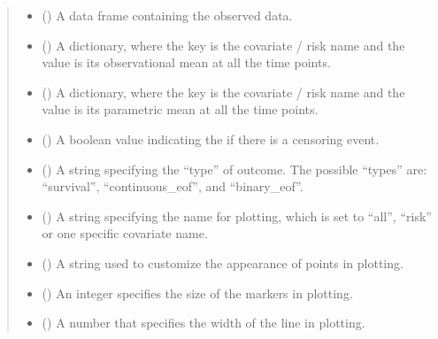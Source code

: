 \documentclass[letterpaper,10pt,english]{sphinxmanual}
\begin{document}
\begin{fulllineitems}
\begin{quote}
\begin{description}
\begin{itemize}
\item {} 
\sphinxAtStartPar
{} () \textendash{} A data frame containing the observed data.

\item {} 
\sphinxAtStartPar
{} () \textendash{} A dictionary, where the key is the covariate / risk name and the value is its observational mean at all the time points.

\item {} 
\sphinxAtStartPar
{} () \textendash{} A dictionary, where the key is the covariate / risk name and the value is its parametric mean at all the time points.

\item {} 
\sphinxAtStartPar
{} () \textendash{} A boolean value indicating the if there is a censoring event.

\item {} 
\sphinxAtStartPar
{} () \textendash{} A string specifying the “type” of outcome. The possible “types” are: “survival”, “continuous\_eof”, and “binary\_eof”.

\item {} 
\sphinxAtStartPar
{} () \textendash{} A string specifying the name for plotting, which is set to “all”, “risk” or one specific covariate name.

\item {} 
\sphinxAtStartPar
{} () \textendash{} A string used to customize the appearance of points in plotting.

\item {} 
\sphinxAtStartPar
{} () \textendash{} An integer specifies the size of the markers in plotting.

\item {} 
\sphinxAtStartPar
{} () \textendash{} A number that specifies the width of the line in plotting.


\end{itemize}
\end{description}
\end{quote}
\end{fulllineitems}
\end{document}
